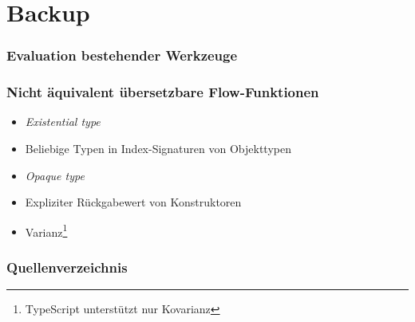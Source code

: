   \appendix

    \begin{frame}
    \end{frame}

  \section{Backup}

    \begin{frame}[noframenumbering]
      \frametitle{Evaluation bestehender Werkzeuge}
      
    \end{frame}

    \begin{frame}
      \frametitle{Nicht äquivalent übersetzbare Flow-Funktionen}
      \begin{itemize}
        \item \textit{Existential type}
        \item Beliebige Typen in Index-Signaturen von Objekttypen
        \item \textit{Opaque type}
        \item Expliziter Rückgabewert von Konstruktoren
        \item Varianz\footnote{TypeScript unterstützt nur Kovarianz}
      \end{itemize}
    \end{frame}

    \begin{frame}
      \frametitle{Quellenverzeichnis}
      \printbibliography
    \end{frame}

